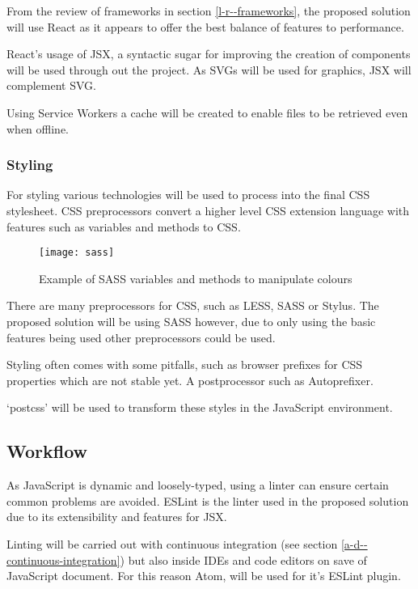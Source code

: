 From the review of frameworks in section \ref{l-r--frameworks}, the proposed solution will use React as it appears to offer the best balance of features to performance.

React's usage of JSX, a syntactic sugar for improving the creation of components will be used through out the project. As SVGs will be used for graphics, JSX will complement SVG. \cite{jsx}

Using Service Workers a cache will be created to enable files to be retrieved even when offline.

\subsubsection{Styling} \label{a-d--t--styling}
For styling various technologies will be used to process into the final CSS stylesheet. CSS preprocessors convert a higher level CSS extension language with features such as variables and methods to CSS.

\begin{figure}[H]
  \centering
    \texttt{[image: sass]}
  \caption{Example of SASS variables and methods to manipulate colours}
  \label{figure-sass}
\end{figure}

There are many preprocessors for CSS, such as LESS, SASS or Stylus. The proposed solution will be using SASS however, due to only using the basic features being used other preprocessors could be used. \cite{SASS}

Styling often comes with some pitfalls, such as browser prefixes for CSS properties which are not stable yet. A postprocessor such as Autoprefixer. \cite{autoprefixer}

`postcss' will be used to transform these styles in the JavaScript environment. \cite{postcss}

\subsection{Workflow} \label{a-d--workflow}

As JavaScript is dynamic and loosely-typed, using a linter can ensure certain common problems are avoided. ESLint is the linter used in the proposed solution due to its extensibility and features for JSX. \cite{eslint}

Linting will be carried out with continuous integration (see section \ref{a-d--continuous-integration}) but also inside IDEs and code editors on save of JavaScript document. For this reason Atom, will be used for it's ESLint plugin.

